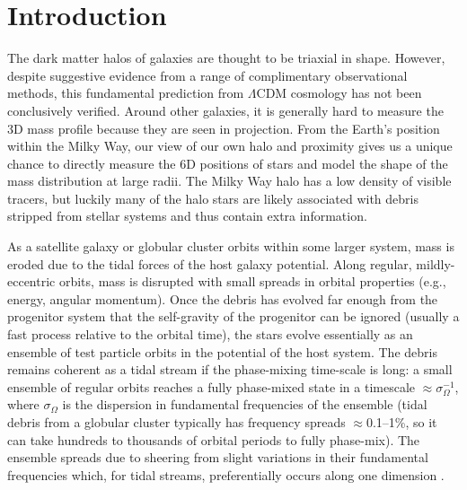 \documentclass[letterpaper,12pt,preprint]{aastex}
\begin{document}
\keywords{
}

\section{Introduction}\label{sec:introduction}

The dark matter halos of galaxies are thought to be triaxial in shape. However, despite suggestive evidence from a range of complimentary observational methods, this fundamental prediction from $\Lambda$CDM cosmology has not been conclusively verified. Around other galaxies, it is generally hard to measure the 3D mass profile because they are seen in projection. From the Earth's position within the Milky Way, our view of our own halo and proximity gives us a unique chance to directly measure the 6D positions of stars and model the shape of the mass distribution at large radii. The Milky Way halo has a low density of visible tracers, but luckily many of the halo stars are likely associated with debris stripped from stellar systems and thus contain extra information.

As a satellite galaxy or globular cluster orbits within some larger system, mass is eroded due to the tidal forces of the host galaxy potential. Along regular, mildly-eccentric orbits, mass is disrupted with small spreads in orbital properties (e.g., energy, angular momentum). Once the debris has evolved far enough from the progenitor system that the self-gravity of the progenitor can be ignored (usually a fast process relative to the orbital time), the stars evolve essentially as an ensemble of test particle orbits in the potential of the host system. The debris remains coherent as a tidal stream if the phase-mixing time-scale is long: a small ensemble of regular orbits reaches a fully phase-mixed state in a timescale $\approx\sigma_\Omega^{-1}$, where $\sigma_\Omega$ is the dispersion in fundamental frequencies of the ensemble (tidal debris from a globular cluster typically has frequency spreads $\approx$0.1--1\%, so it can take hundreds to thousands of orbital periods to fully phase-mix). The ensemble spreads due to sheering from slight variations in their fundamental frequencies which, for tidal streams, preferentially occurs along one dimension \citep{merritt96, helmi99}. 
\end{document}
